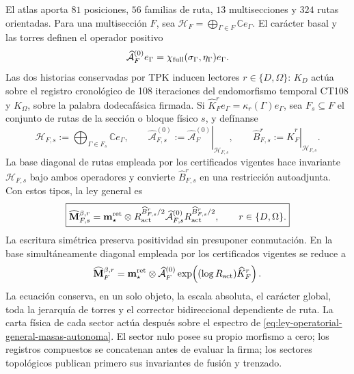 El atlas aporta \(81\) posiciones, \(56\) familias de ruta, \(13\)
multisecciones y \(324\) rutas orientadas. Para una multisección \(F\), sea
\(\mathcal H_F=\bigoplus_{\Gamma\in F}\mathbb C e_\Gamma\). El carácter
basal y las torres definen el operador positivo
\begin{equation}
 \widehat{\mathcal A}^{(0)}_F e_\Gamma
 =\chi_{\rm full}(\sigma_\Gamma,\eta_\Gamma)e_\Gamma.
 \label{eq:operador-caracter-basal-masas-autonoma}
\end{equation}
Las dos historias conservadas por TPK inducen lectores
\(r\in\{D,\Omega\}\): \(K_D\) actúa sobre el registro cronológico de
108 iteraciones del endomorfismo temporal CT108 y \(K_\Omega\), sobre la palabra
dodecafásica firmada. Si
\(\widehat K_F^r e_\Gamma=\kappa_r(\Gamma)e_\Gamma\), sea
\(F_s\subseteq F\) el conjunto de rutas de la sección o bloque físico \(s\), y
defínanse
\begin{equation}
 \mathcal H_{F,s}:=\bigoplus_{\Gamma\in F_s}\mathbb C e_\Gamma,
 \qquad
 \widehat{\mathcal A}^{(0)}_{F,s}
 :=\left.\widehat{\mathcal A}^{(0)}_F\right|_{\mathcal H_{F,s}},
 \qquad
 \widehat B_{F,s}^r
 :=\left.\widehat K_F^r\right|_{\mathcal H_{F,s}}.
 \label{eq:restricciones-bloque-ley-masas-autonoma}
\end{equation}
La base diagonal de rutas empleada por los certificados vigentes hace invariante
\(\mathcal H_{F,s}\) bajo ambos operadores y convierte
\(\widehat B_{F,s}^r\) en una restricción autoadjunta. Con estos tipos, la ley
general es
\begin{equation}
 \boxed{
 \widehat{\mathbf M}^{\beta,r}_{F,s}
 =\mathbf m_\star^{\rm ret}\otimes
  R_{\rm act}^{\widehat B_{F,s}^r/2}
  \widehat{\mathcal A}^{(0)}_{F,s}
  R_{\rm act}^{\widehat B_{F,s}^r/2},
 \qquad r\in\{D,\Omega\}.}
 \label{eq:ley-operatorial-general-masas-autonoma}
\end{equation}
La escritura simétrica preserva positividad sin presuponer conmutación. En la
base simultáneamente diagonal empleada por los
certificados vigentes se reduce a
\begin{equation}
 \widehat{\mathbf M}^{\beta,r}_F
 =\mathbf m_\star^{\rm ret}\otimes
  \widehat{\mathcal A}^{(0)}_F
  \exp\!\left((\log R_{\rm act})\widehat K_F^r\right).
 \label{eq:ley-operatorial-diagonal-masas-autonoma}
\end{equation}
La ecuación conserva, en un solo objeto, la escala absoluta, el carácter
global, toda la jerarquía de torres y el corrector bidireccional dependiente
de ruta. La carta física de cada sector actúa después sobre el espectro de
\eqref{eq:ley-operatorial-general-masas-autonoma}. El sector nulo posee su
propio morfismo a cero; los registros compuestos se concatenan antes de
evaluar la firma; los sectores topológicos publican primero sus invariantes
de fusión y trenzado.

